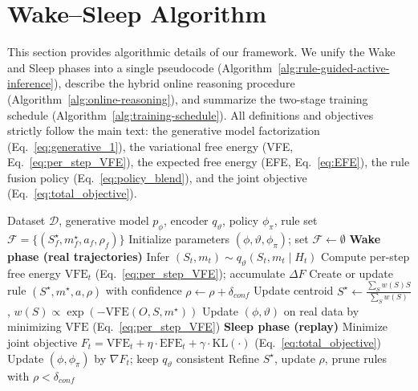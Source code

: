\documentclass{article} %
\begin{document}
\section{Wake–Sleep Algorithm}
\label{Sec:A}

This section provides algorithmic details of our framework. We unify the Wake and Sleep phases into a single pseudocode (Algorithm~\ref{alg:rule-guided-active-inference}), describe the hybrid online reasoning procedure (Algorithm~\ref{alg:online-reasoning}), and summarize the two-stage training schedule (Algorithm~\ref{alg:training-schedule}). All definitions and objectives strictly follow the main text: the generative model factorization (Eq.~\ref{eq:generative_1}), the variational free energy (VFE, Eq.~\ref{eq:per_step_VFE}), the expected free energy (EFE, Eq.~\ref{eq:EFE}), the rule fusion policy (Eq.~\ref{eq:policy_blend}), and the joint objective (Eq.~\ref{eq:total_objective}).

\begin{algorithm}[ht]
\caption{Rule-Guided Active Inference: Unified Wake–Sleep Cycle}
\label{alg:rule-guided-active-inference}
\begin{algorithmic}[1]
\Require Dataset $\mathcal D$, generative model $p_{\phi}$, encoder $q_{\vartheta}$, policy $\phi_{\pi}$, rule set $\mathcal F=\{(S_f^\star,m_f^\star,a_f,\rho_f)\}$
\State Initialize parameters $(\phi,\vartheta,\phi_{\pi})$; set $\mathcal F\leftarrow\emptyset$
  \State \textbf{Wake phase (real trajectories)}
      \State Infer $(S_t,m_t)\sim q_{\vartheta}(S_t,m_t\mid H_t)$
      \State Compute per-step free energy $\mathrm{VFE}_t$ (Eq.~\ref{eq:per_step_VFE}); accumulate $\Delta F$
        \State Create or update rule $(S^\star,m^\star,a,\rho)$ with confidence $\rho\gets\rho+\delta_{conf}$
        \State Update centroid $S^\star \gets \frac{\sum_{S} w(S)S}{\sum_{S} w(S)}$, $w(S)\!\propto\!\exp(-\mathrm{VFE}(O,S,m^\star))$
      \EndIf
    \EndFor
  \EndFor
  \State Update $(\phi,\vartheta)$ on real data by minimizing $\mathrm{VFE}$ (Eq.~\ref{eq:per_step_VFE})
  \Statex
  \State \textbf{Sleep phase (replay)}
    \State Minimize joint objective $F_t=\mathrm{VFE}_t+\eta\cdot\mathrm{EFE}_t+\gamma\cdot\mathrm{KL}(\cdot)$ (Eq.~\ref{eq:total_objective})
    \State Update $(\phi,\phi_{\pi})$ by $\nabla F_t$; keep $q_{\vartheta}$ consistent
    \State Refine $S^\star$, update $\rho$, prune rules with $\rho<\delta_{conf}$
  \EndFor
\EndFor
\end{algorithmic}
\end{algorithm}
\end{document}
